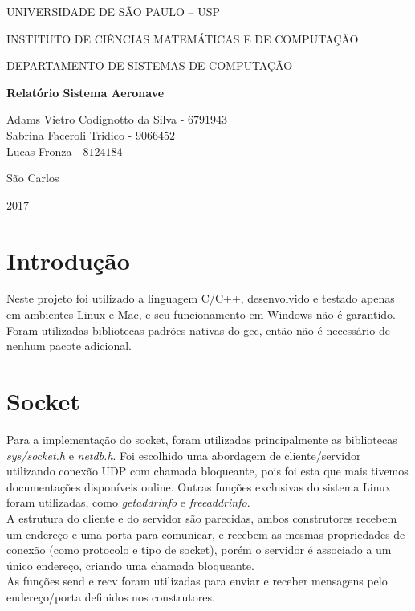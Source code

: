 \documentclass[10pt,a4paper]{article}
\newcommand*\NewPage{\newpage\null\thispagestyle{empty}\newpage}
\begin{document}
\thispagestyle{empty}
\begin{center}
	UNIVERSIDADE DE SÃO PAULO – USP
	
	INSTITUTO DE CIÊNCIAS MATEMÁTICAS E DE COMPUTAÇÃO
	
	DEPARTAMENTO DE SISTEMAS DE COMPUTAÇÃO
	
	\vspace{7cm}
	
	\Large{\textbf{Relatório Sistema Aeronave}}\\
	
	\vspace{6cm}
	
	Adams Vietro Codignotto da Silva - $6791943$ \\ 
	Sabrina Faceroli Tridico - $9066452$\\
	Lucas Fronza - $8124184$\\
	
		
	
	\vspace{6cm}
	
	São Carlos
	
	2017
\end{center}

\NewPage
{}

\tableofcontents

\newpage

\section{Introdução}
Neste projeto foi utilizado a linguagem C/C++, desenvolvido e testado apenas em ambientes Linux e Mac, e seu funcionamento em Windows não é garantido. Foram utilizadas bibliotecas padrões nativas do gcc, então não é necessário de nenhum pacote adicional.
\section{Socket}
Para a implementação do socket, foram utilizadas principalmente as bibliotecas \textit{sys/socket.h} e \textit{netdb.h}. Foi escolhido uma abordagem de cliente/servidor utilizando conexão UDP com chamada bloqueante, pois foi esta que mais tivemos documentações disponíveis online. Outras funções exclusivas do sistema Linux foram utilizadas, como \textit{getaddrinfo} e \textit{freeaddrinfo}.\\
A estrutura do cliente e do servidor são parecidas, ambos construtores recebem um endereço e uma porta para comunicar, e recebem as mesmas propriedades de conexão (como protocolo e tipo de socket), porém o servidor é associado a um único endereço, criando uma chamada bloqueante.\\
As funções send e recv foram utilizadas para enviar e receber mensagens pelo endereço/porta definidos nos construtores.
\end{document}
